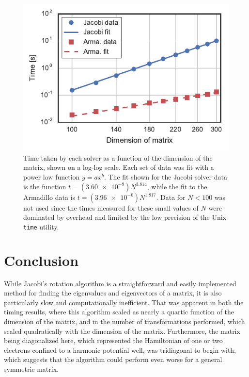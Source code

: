 \documentclass[aps,prc,reprint]{revtex4-1}
\begin{document}
        \begin{figure}
            \includegraphics{timing.pdf}
            \caption{Time taken by each solver as a function of the dimension of the matrix, shown on a log-log scale. Each set of data was fit with a power law function $y=ax^b$. The fit shown for the Jacobi solver data is the function $t=(\num{3.60e-9}) N^{3.814}$, while the fit to the Armadillo data is $t=(\num{3.96e-6}) N^{1.817}$. Data for $N<100$ was not used since the times measured for these small values of $N$ were dominated by overhead and limited by the low precision of the Unix \texttt{time} utility.}
            \label{fig:times}
        \end{figure}

\section{Conclusion}
\label{sec:conclusion}
    While Jacobi's rotation algorithm is a straightforward and easily implemented method for finding the eigenvalues and eigenvectors of a matrix, it is also particularly slow and computationally inefficient. That was apparent in both the timing results, where this algorithm scaled as nearly a quartic function of the dimension of the matrix, and in the number of transformations performed, which scaled quadratically with the dimension of the matrix. Furthermore, the matrix being diagonalized here, which represented the Hamiltonian of one or two electrons confined to a harmonic potential well, was tridiagonal to begin with, which suggests that the algorithm could perform even worse for a general symmetric matrix.
\end{document}
